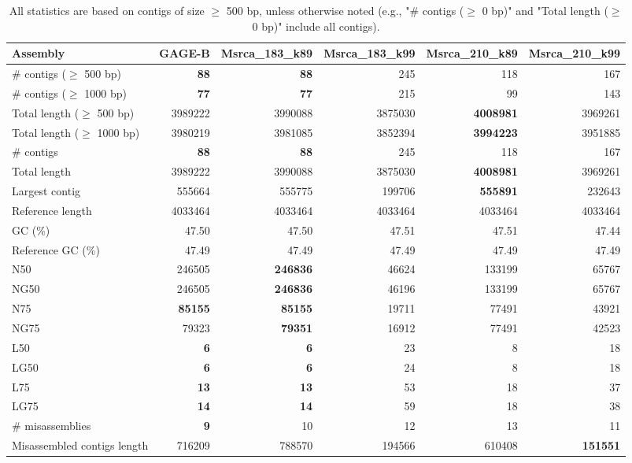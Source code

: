 \documentclass[12pt,a4paper]{article}
\begin{document}
\begin{table}[ht]
\begin{center}
\caption{All statistics are based on contigs of size $\geq$ 500 bp, unless otherwise noted (e.g., "\# contigs ($\geq$ 0 bp)" and "Total length ($\geq$ 0 bp)" include all contigs).}
\begin{tabular}{|l*{5}{|r}|}
\hline
Assembly & GAGE-B & Msrca\_183\_k89 & Msrca\_183\_k99 & Msrca\_210\_k89 & Msrca\_210\_k99 \\ \hline
\# contigs ($\geq$ 500 bp) & {\bf 88} & {\bf 88} & 245 & 118 & 167 \\ \hline
\# contigs ($\geq$ 1000 bp) & {\bf 77} & {\bf 77} & 215 & 99 & 143 \\ \hline
Total length ($\geq$ 500 bp) & 3989222 & 3990088 & 3875030 & {\bf 4008981} & 3969261 \\ \hline
Total length ($\geq$ 1000 bp) & 3980219 & 3981085 & 3852394 & {\bf 3994223} & 3951885 \\ \hline
\# contigs & {\bf 88} & {\bf 88} & 245 & 118 & 167 \\ \hline
Total length & 3989222 & 3990088 & 3875030 & {\bf 4008981} & 3969261 \\ \hline
Largest contig & 555664 & 555775 & 199706 & {\bf 555891} & 232643 \\ \hline
Reference length & 4033464 & 4033464 & 4033464 & 4033464 & 4033464 \\ \hline
GC (\%) & 47.50 & 47.50 & 47.51 & 47.51 & 47.44 \\ \hline
Reference GC (\%) & 47.49 & 47.49 & 47.49 & 47.49 & 47.49 \\ \hline
N50 & 246505 & {\bf 246836} & 46624 & 133199 & 65767 \\ \hline
NG50 & 246505 & {\bf 246836} & 46196 & 133199 & 65767 \\ \hline
N75 & {\bf 85155} & {\bf 85155} & 19711 & 77491 & 43921 \\ \hline
NG75 & 79323 & {\bf 79351} & 16912 & 77491 & 42523 \\ \hline
L50 & {\bf 6} & {\bf 6} & 23 & 8 & 18 \\ \hline
LG50 & {\bf 6} & {\bf 6} & 24 & 8 & 18 \\ \hline
L75 & {\bf 13} & {\bf 13} & 53 & 18 & 37 \\ \hline
LG75 & {\bf 14} & {\bf 14} & 59 & 18 & 38 \\ \hline
\# misassemblies & {\bf 9} & 10 & 12 & 13 & 11 \\ \hline
Misassembled contigs length & 716209 & 788570 & 194566 & 610408 & {\bf 151551} \\ \hline

\end{tabular}
\end{center}
\end{table}
\end{document}
